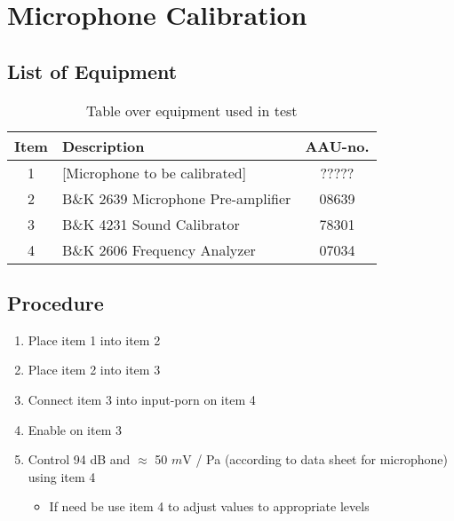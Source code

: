 \section{Microphone Calibration}

\subsection{List of Equipment}
\begin{table}[h]
	\centering
	\begin{tabular}{ c l c } \toprule
		{Item} &	{Description} & {AAU-no}. \\ \bottomrule 
		1	&	[Microphone to be calibrated]			& ?????			\\
		2	&	B\&K 2639 Microphone Pre-amplifier		& 08639			\\  
		3	&	B\&K 4231 Sound Calibrator				& 78301			\\
		4	&	B\&K 2606 Frequency Analyzer			& 07034			\\ \bottomrule 
	\end{tabular}
	\caption{Table over equipment used in test}
	\label{tab:UsedEquipmentListning}
\end{table}

\subsection{Procedure}


\begin{enumerate}
	\item Place item 1 into item 2
	\item Place item 2 into item 3
	\item Connect item 3 into input-porn on item 4
	\item Enable on item 3
	\item Control 94 dB and $\approx$ 50 $m$V / Pa (according to data sheet for microphone) using item 4
	\begin{itemize}
		\item If need be use item 4 to adjust values to appropriate levels
	\end{itemize}
\end{enumerate}

